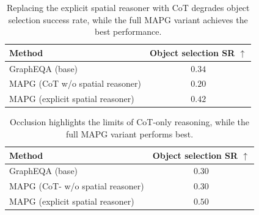 \begin{table}[t]
\centering

\renewcommand{\arraystretch}{1.1}
\setlength{\tabcolsep}{6pt}


\begin{tabular}{l c}
\toprule
\textbf{Method} & \textbf{Object selection SR $\uparrow$} \\
\midrule
GraphEQA (base)                          & $0.34$ \\
MAPG (CoT w/o spatial reasoner)            & $0.20$ \\
MAPG (explicit spatial reasoner)         & $0.42$ \\
\bottomrule
\end{tabular}


\caption{Replacing the explicit spatial reasoner with CoT degrades object selection success rate, while the full MAPG variant achieves the best performance. }
\label{tab:ablations_spatial}
\end{table}




\begin{table}[t]
\centering

\renewcommand{\arraystretch}{1.1}
\setlength{\tabcolsep}{6pt}


\begin{tabular}{l c}
\toprule
\textbf{Method} & \textbf{Object selection SR $\uparrow$} \\
\midrule
GraphEQA (base)                          & $0.30$ \\
MAPG (CoT- w/o spatial reasoner)            & $0.30$ \\
MAPG (explicit spatial reasoner)         & $0.50$ \\
\bottomrule
\end{tabular}


\caption{Occlusion highlights the limits of CoT-only reasoning, while the full MAPG variant performs best.}
\label{tab:ablations_occlusion}
\end{table}







